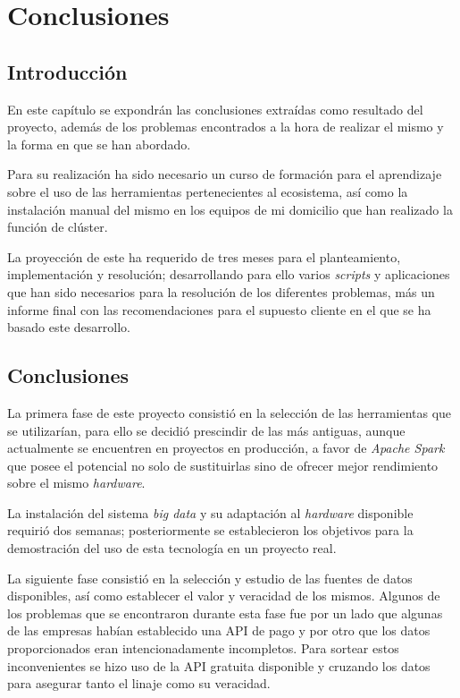 \chapter{Conclusiones\label{sec:conclusiones}}

\section{Introducción}
En este capítulo se expondrán las conclusiones extraídas como resultado del proyecto, además de los problemas encontrados a la hora de realizar el mismo y la forma en que se han abordado.

Para su realización ha sido necesario un curso de formación para el aprendizaje sobre el uso de las herramientas pertenecientes al ecosistema, así como la instalación manual del mismo en los equipos de mi domicilio que han realizado la función de clúster. 

La proyección de este ha requerido de tres meses para el planteamiento, implementación y resolución; desarrollando para ello varios \textit{scripts} y aplicaciones que han sido necesarios para la resolución de los diferentes problemas, más un informe final con las recomendaciones para el supuesto cliente en el que se ha basado este desarrollo.

\clearpage
\section{Conclusiones}
La primera fase de este proyecto consistió en la selección de las herramientas que se utilizarían, para ello se decidió prescindir de las más antiguas, aunque actualmente se encuentren en proyectos en producción, a favor de \textit{Apache Spark} que posee el potencial no solo de sustituirlas sino de ofrecer mejor rendimiento sobre el mismo \textit{hardware}.

La instalación del sistema \textit{big data} y su adaptación al \textit{hardware} disponible requirió dos semanas; posteriormente se establecieron los objetivos para la demostración del uso de esta tecnología en un proyecto real.

La siguiente fase consistió en la selección y estudio de las fuentes de datos disponibles, así como establecer el valor y veracidad de los mismos. Algunos de los problemas que se encontraron durante esta fase fue por un lado que algunas de las empresas habían establecido una \gls{API} de pago y por otro que los datos proporcionados eran intencionadamente incompletos. Para sortear estos inconvenientes se hizo uso de la \gls{API} gratuita disponible y cruzando los datos para asegurar tanto el linaje como su veracidad.

